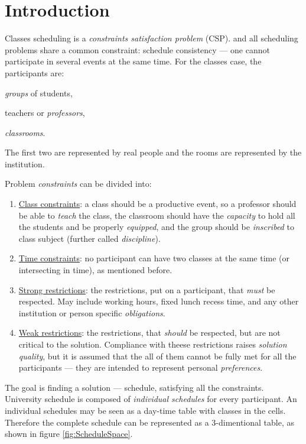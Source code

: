 
\section{Introduction}

Classes scheduling is a \emph{constraints satisfaction problem} (CSP).
and all scheduling problems share a common constraint: schedule consistency ---
one cannot participate in several events at the same time. For the classes case,
the participants are:
\begin{enumerate*}
  \item \emph{groups} of students,
  \item teachers or \emph{professors},
  \item \emph{classrooms}.
\end{enumerate*}
The first two are represented by real people and the rooms are represented by
the institution.

Problem \emph{constraints} can be divided into:
\begin{enumerate}
  \item \underline{Class constraints}: a class should be a productive event, so
    a professor should be able to \emph{teach} the class, the classroom should
    have the \emph{capacity} to hold all the students and be properly \emph{equipped},
    and the group should be \emph{inscribed} to class subject
    (further called \emph{discipline}).
  \item \underline{Time constraints}: no participant can have two classes
    at the same time (or intersecting in time), as mentioned before.
  \item \underline{Strong restrictions}: the restrictions, put on a participant, that
    \emph{must} be respected. May include working hours, fixed lunch recess time,
    and any other institution or person specific \emph{obligations}.
  \item \underline{Weak restrictions}: the restrictions, that \emph{should} be respected,
    but are not critical to the solution. Compliance with theese restrictions
    raises \emph{solution quality}, but it is assumed that the all of them
    cannot be fully met for all the participants --- they are intended to
    represent personal \emph{preferences}.
\end{enumerate}

The goal is finding a solution --- schedule, satisfying all the constraints.
University schedule is composed of \emph{individual schedules} for every
participant. An individual schedules may be seen as a day-time table with
classes in the cells. Therefore the complete schedule can be represented as a
3-dimentional table, as shown in figure \ref{fig:ScheduleSpace}.
\bigskip

